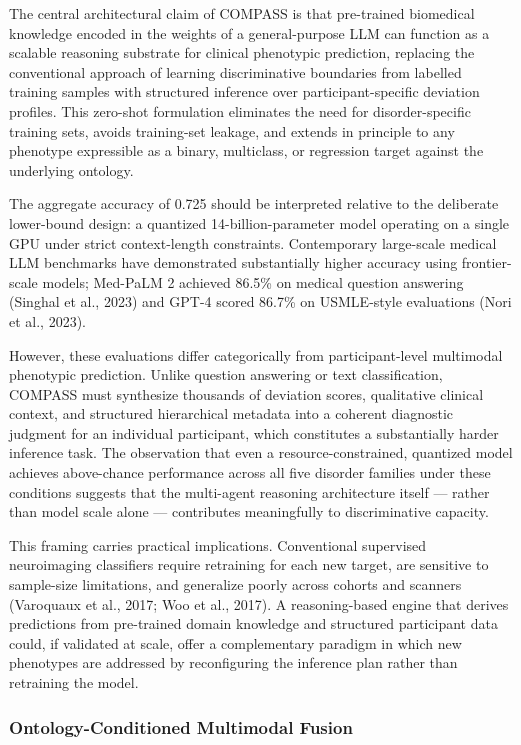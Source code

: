 \documentclass[11pt,a4paper,twoside]{article}
\begin{document}
The central architectural claim of COMPASS is that pre-trained biomedical knowledge encoded in the weights of a general-purpose LLM can function as a scalable reasoning substrate for clinical phenotypic prediction, replacing the conventional approach of learning discriminative boundaries from labelled training samples with structured inference over participant-specific deviation profiles. This zero-shot formulation eliminates the need for disorder-specific training sets, avoids training-set leakage, and extends in principle to any phenotype expressible as a binary, multiclass, or regression target against the underlying ontology.

The aggregate accuracy of 0.725 should be interpreted relative to the deliberate lower-bound design: a quantized 14-billion-parameter model operating on a single GPU under strict context-length constraints. Contemporary large-scale medical LLM benchmarks have demonstrated substantially higher accuracy using frontier-scale models; Med-PaLM 2 achieved 86.5\% on medical question answering (Singhal et al., 2023) and GPT-4 scored 86.7\% on USMLE-style evaluations (Nori et al., 2023). 

However, these evaluations differ categorically from participant-level multimodal phenotypic prediction. Unlike question answering or text classification, COMPASS must synthesize thousands of deviation scores, qualitative clinical context, and structured hierarchical metadata into a coherent diagnostic judgment for an individual participant, which constitutes a substantially harder inference task. The observation that even a resource-constrained, quantized model achieves above-chance performance across all five disorder families under these conditions suggests that the multi-agent reasoning architecture itself --- rather than model scale alone --- contributes meaningfully to discriminative capacity.

This framing carries practical implications. Conventional supervised neuroimaging classifiers require retraining for each new target, are sensitive to sample-size limitations, and generalize poorly across cohorts and scanners (Varoquaux et al., 2017; Woo et al., 2017). A reasoning-based engine that derives predictions from pre-trained domain knowledge and structured participant data could, if validated at scale, offer a complementary paradigm in which new phenotypes are addressed by reconfiguring the inference plan rather than retraining the model.

\subsubsection{Ontology-Conditioned Multimodal Fusion}
\end{document}
